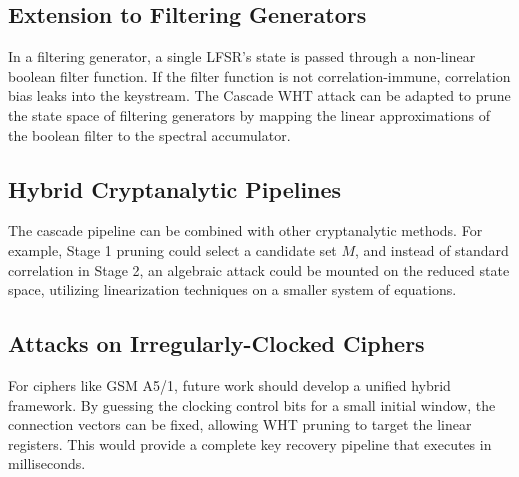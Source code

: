 \subsection{Extension to Filtering Generators}
In a filtering generator, a single LFSR's state is passed through a non-linear boolean filter function. If the filter function is not correlation-immune, correlation bias leaks into the keystream. The Cascade WHT attack can be adapted to prune the state space of filtering generators by mapping the linear approximations of the boolean filter to the spectral accumulator.

\subsection{Hybrid Cryptanalytic Pipelines}
The cascade pipeline can be combined with other cryptanalytic methods. For example, Stage 1 pruning could select a candidate set $M$, and instead of standard correlation in Stage 2, an algebraic attack could be mounted on the reduced state space, utilizing linearization techniques on a smaller system of equations.

\subsection{Attacks on Irregularly-Clocked Ciphers}
For ciphers like GSM A5/1, future work should develop a unified hybrid framework. By guessing the clocking control bits for a small initial window, the connection vectors can be fixed, allowing WHT pruning to target the linear registers. This would provide a complete key recovery pipeline that executes in milliseconds.

